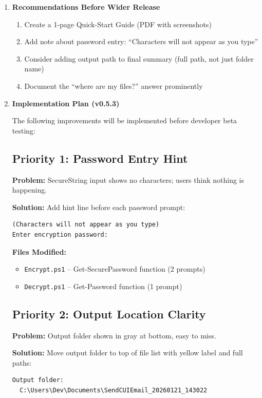 \documentclass[11pt,letterpaper]{article}
\newcommand{\dmsection}[1]{\item \textbf{#1}\par}
\begin{document}
\begin{enumerate}
\dmsection{Recommendations Before Wider Release}

\begin{enumerate}
    \item Create a 1-page Quick-Start Guide (PDF with screenshots)
    \item Add note about password entry: ``Characters will not appear as you type''
    \item Consider adding output path to final summary (full path, not just folder name)
    \item Document the ``where are my files?'' answer prominently
\end{enumerate}

\dmsection{Implementation Plan (v0.5.3)}

The following improvements will be implemented before developer beta testing:

\subsection*{Priority 1: Password Entry Hint}

\textbf{Problem:} SecureString input shows no characters; users think nothing is happening.

\textbf{Solution:} Add hint line before each password prompt:
\begin{verbatim}
(Characters will not appear as you type)
Enter encryption password:
\end{verbatim}

\textbf{Files Modified:}
\begin{itemize}
    \item \texttt{Encrypt.ps1} -- Get-SecurePassword function (2 prompts)
    \item \texttt{Decrypt.ps1} -- Get-Password function (1 prompt)
\end{itemize}

\subsection*{Priority 2: Output Location Clarity}

\textbf{Problem:} Output folder shown in gray at bottom, easy to miss.

\textbf{Solution:} Move output folder to top of file list with yellow label and full paths:
\begin{verbatim}
Output folder:
  C:\Users\Dev\Documents\SendCUIEmail_20260121_143022


\end{verbatim}
\end{enumerate}
\end{document}
